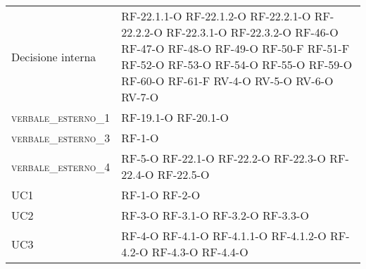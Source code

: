 \begin{longtable}{ 
		>{}p{} 
		>{}p{} }
Decisione interna &
RF-22.1.1-O \newline
RF-22.1.2-O \newline
RF-22.2.1-O \newline 
RF-22.2.2-O \newline
RF-22.3.1-O \newline
RF-22.3.2-O \newline
RF-46-O \newline
RF-47-O \newline
RF-48-O \newline
RF-49-O \newline
RF-50-F \newline
RF-51-F \newline
RF-52-O \newline
RF-53-O \newline
RF-54-O \newline
RF-55-O \newline
RF-59-O \newline
RF-60-O \newline
RF-61-F \newline
RV-4-O \newline
RV-5-O \newline
RV-6-O \newline
RV-7-O
\tabularnewline
	
\textsc{verbale\_esterno\_1} &
	RF-19.1-O	\newline
	RF-20.1-O	
	\tabularnewline

\textsc{verbale\_esterno\_3} &
	RF-1-O
	\tabularnewline

\textsc{verbale\_esterno\_4} &
	RF-5-O	\newline
	RF-22.1-O\newline
	RF-22.2-O\newline
	RF-22.3-O\newline
	RF-22.4-O\newline
	RF-22.5-O	
	\tabularnewline
		
UC1 &
	RF-1-O	\newline
	RF-2-O	\tabularnewline
	
UC2 &
	RF-3-O \newline
	RF-3.1-O \newline
	RF-3.2-O \newline
	RF-3.3-O \newline
\tabularnewline
	
UC3 &
RF-4-O \newline
RF-4.1-O \newline
RF-4.1.1-O \newline
RF-4.1.2-O \newline
RF-4.2-O \newline
RF-4.3-O \newline
RF-4.4-O
\tabularnewline


\end{longtable}
